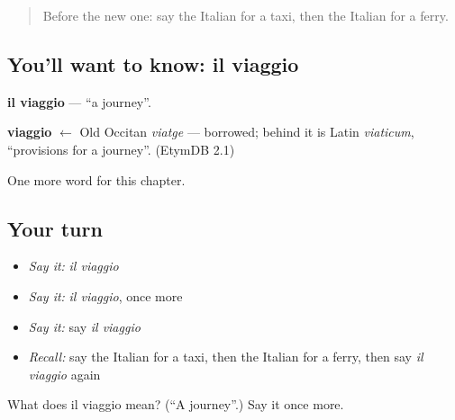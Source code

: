 \label{lesson:IT-C92-viaggio}



\begin{quote}
Before the new one: say the Italian for a taxi, then the Italian for a ferry.
\end{quote}

\subsection*{You'll want to know: il viaggio}
\textbf{il viaggio} — \textquotedblleft{}a journey\textquotedblright{}.

\begin{cousinweb}
\textbf{viaggio} $\leftarrow$ Old Occitan \emph{viatge} — borrowed; behind it is Latin \emph{viaticum}, \textquotedblleft{}provisions for a journey\textquotedblright{}. (EtymDB 2.1)
\end{cousinweb}

\begin{grammarlens}[title={What you've built}]
One more word for this chapter.
\end{grammarlens}

\subsection*{Your turn}
\begin{itemize}
\raggedright
  \item \emph{Say it:} \emph{il viaggio}
  \item \emph{Say it:} \emph{il viaggio}, once more
  \item \emph{Say it:} say \emph{il viaggio}
  \item \emph{Recall:} say the Italian for a taxi, then the Italian for a ferry, then say \emph{il viaggio} again
\end{itemize}

\begin{tcolorbox}[breakable,colback=teal!4,colframe=teal!35!black,title={Before you move on}]
What does il viaggio mean? (\textquotedblleft{}A journey\textquotedblright{}.) Say it once more.
\end{tcolorbox}
